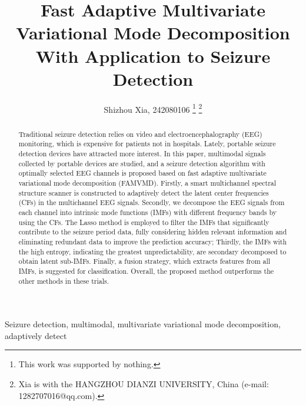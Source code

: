 \documentclass[journal,twoside,web]{ieeecolor2}
\begin{document}
\title{Fast Adaptive Multivariate Variational Mode Decomposition With Application to Seizure Detection}
\author{Shizhou Xia, 242080106
\thanks{This work was supported by nothing.}
\thanks{Xia is with the HANGZHOU DIANZI UNIVERSITY, China 
(e-mail: 1282707016@qq.com). }
}

\maketitle

\begin{abstract}
Traditional seizure detection relies on video and electroencephalography (EEG) monitoring, which is expensive for patients not in hospitals. Lately, portable seizure detection devices have attracted more interest. In this paper, multimodal signals collected by portable devices are studied, and a seizure detection algorithm with optimally selected EEG channels is proposed based on fast adaptive multivariate variational mode decomposition (FAMVMD). Firstly, a smart multichannel spectral structure scanner is constructed to adaptively detect the latent center frequencies (CFs) in the multichannel EEG signals. Secondly, we decompose the EEG signals from each channel into intrinsic mode functions (IMFs) with different frequency bands by using the CFs. The Lasso method is employed to filter the IMFs that significantly contribute to the seizure period data, fully considering hidden relevant information and eliminating redundant data to improve the prediction accuracy; Thirdly, the IMFs with the high entropy, indicating the greatest unpredictability, are secondary decomposed to obtain latent sub-IMFs. Finally, a fusion strategy, which extracts features from all IMFs, is suggested for classification. Overall, the proposed method outperforms the other methods in these trials.    
\end{abstract}

\begin{IEEEkeywords}
Seizure detection, multimodal, multivariate variational mode decomposition, adaptively detect
\end{IEEEkeywords}
\end{document}
